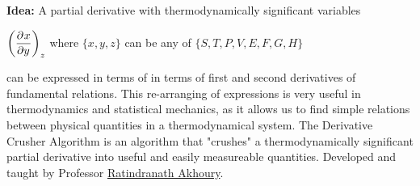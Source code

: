 \documentclass{article}
\date{Winter 2022}
\author{\small Typed in \LaTeX\ by \EC}
\begin{document}
\maketitle
\noindent\textbf{Idea:} A partial derivative with thermodynamically significant variables
    \begin{center}
        $\displaystyle\qty(\pder{x}{y})_z$ where $\{x,y,z\}$ can be any of $\{S,T,P,V,E,F,G,H\}$
    \end{center}
    can be expressed in terms of in terms of first and second derivatives of fundamental relations. This re-arranging of expressions is very useful in thermodynamics and statistical mechanics, as it allows us to find simple relations between physical quantities in a thermodynamical system. The 
    Derivative Crusher Algorithm is an algorithm that "crushes" a thermodynamically significant partial derivative into useful and easily measureable quantities. Developed and taught by Professor \hyperlink{https://lsa.umich.edu/physics/people/faculty/akhoury.html}{ Ratindranath Akhoury}.
\end{document}

